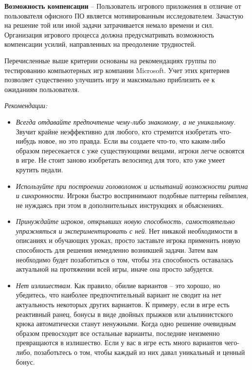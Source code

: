 \documentclass{article}
\begin{document}
\textbf{Возможность компенсации} -- Пользователь игрового приложения в отличие от пользователя офисного ПО является мотивированным исследователем. Зачастую на решение той или иной задачи затрачивается немало времени и сил. Организация игрового процесса должна предусматривать возможность компенсации усилий, направленных на преодоление трудностей.

\bigskip

Перечисленные выше критерии основаны на рекомендациях группы по тестированию компьютерных игр компании Microsoft. Учет этих критериев позволяет существенно улучшить игру и максимально приблизить ее к ожиданиям пользователя.

\bigskip

\noindent\textit{Рекомендации:}
\begin{itemize}
  \item \textit{Всегда отдавайте предпочтение чему-либо знакомому, а не уникальному}. Звучит крайне неэффективно для любого, кто стремится изобретать что-нибудь новое, но это правда. Если вы создаете что-то, что каким-либо образом пересекается с уже существующими вещами, игроки легче освоятся в игре. Не стоит заново изобретать велосипед для того, кто уже умеет крутить педали.
  \item \textit{Используйте при построении головоломок и испытаний возможности ритма и синхронности}. Игроки быстро воспринимают подобные паттерны геймплея, не нуждаясь при этом в дополнительных инструкциях и объяснениях.
  \item \textit{Принуждайте игроков, открывших новую способность, самостоятельно упражняться и экспериментировать с ней}. Нет никакой необходимости в описаниях и обучающих уроках, просто заставьте игрока применить новую способность для решения немедленно возникшей задачи. Затем вам необходимо будет позаботиться о том, чтобы эта способность оставалась актуальной на протяжении всей игры, иначе она просто забудется.
  \item \textit{Нет излишествам}. Как правило, обилие вариантов – это хорошо, но убедитесь, что наиболее предпочтительный вариант не сводит на нет актуальность некоторых других вариантов. К примеру, если в игре есть реактивный ранец, бонусы в виде двойных прыжков или альпинистского крюка автоматически станут ненужными. Когда одно решение очевидным образом превосходит все остальные варианты, последние неизменно превращаются в излишество. Если у вас в игре есть много вариантов чего-либо, позаботьтесь о том, чтобы каждый из них давал уникальный и ценный бонус.
\end{itemize}
\end{document}
